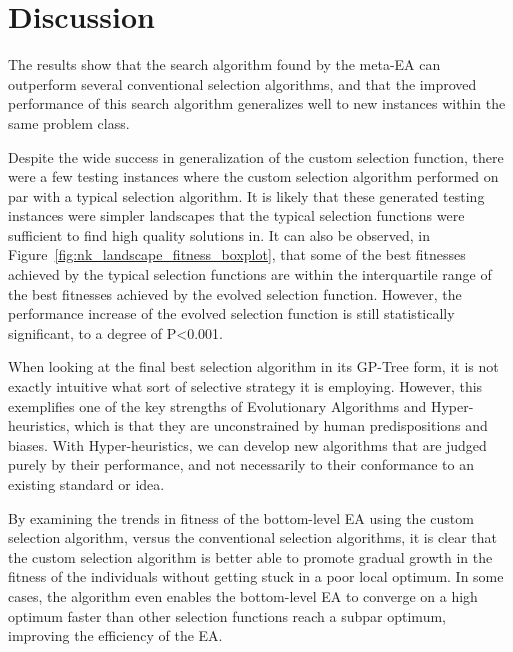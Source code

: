 \documentclass[sigconf]{acmart}
\begin{document}
\section{Discussion}
\label{Discussion}
The results show that the search algorithm found by the meta-EA can outperform several conventional selection algorithms, and that the improved performance of this search algorithm generalizes well to new instances within the same problem class. 

Despite the wide success in generalization of the custom selection function, there were a few testing instances where the custom selection algorithm performed on par with a typical selection algorithm. It is likely that these generated testing instances were simpler landscapes that the typical selection functions were sufficient to find high quality solutions in. It can also be observed, in Figure~\ref{fig:nk_landscape_fitness_boxplot}, that some of the best fitnesses achieved by the typical selection functions are within the interquartile range of the best fitnesses achieved by the evolved selection function. However, the performance increase of the evolved selection function is still statistically significant, to a degree of P<0.001.

When looking at the final best selection algorithm in its GP-Tree form, it is not exactly intuitive what sort of selective strategy it is employing. However, this exemplifies one of the key strengths of Evolutionary Algorithms and Hyper-heuristics, which is that they are unconstrained by human predispositions and biases. With Hyper-heuristics, we can develop new algorithms that are judged purely by their performance, and not necessarily to their conformance to an existing standard or idea.

By examining the trends in fitness of the bottom-level EA using the custom selection algorithm, versus the conventional selection algorithms, it is clear that the custom selection algorithm is better able to promote gradual growth in the fitness of the individuals without getting stuck in a poor local optimum. In some cases, the algorithm even enables the bottom-level EA to converge on a high optimum faster than other selection functions reach a subpar optimum, improving the efficiency of the EA.
\end{document}
